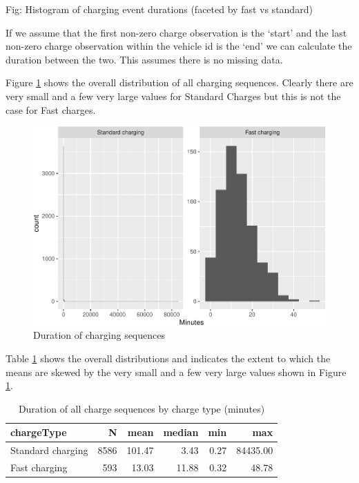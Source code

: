 \documentclass[]{article}
\begin{document}
Fig: Histogram of charging event durations (faceted by fast vs standard)

If we assume that the first non-zero charge observation is the `start'
and the last non-zero charge observation within the vehicle id is the
`end' we can calculate the duration between the two. This assumes there
is no missing data.

Figure \ref{fig:durationHist} shows the overall distribution of all
charging sequences. Clearly there are very small and a few very large
values for Standard Charges but this is not the case for Fast charges.

\begin{figure}
\centering
\includegraphics{EVBB_report_files/figure-latex/durationHist-1.pdf}
\caption{\label{fig:durationHist}Duration of charging sequences}
\end{figure}

Table \ref{tab:durationDescTable} shows the overall distributions and
indicates the extent to which the means are skewed by the very small and
a few very large values shown in Figure \ref{fig:durationHist}.

\begin{table}[t]

\caption{\label{tab:durationDescTable}Duration of all charge sequences by charge type (minutes)}
\centering
\begin{tabular}{l|r|r|r|r|r}
\hline
chargeType & N & mean & median & min & max\\
\hline
Standard charging & 8586 & 101.47 & 3.43 & 0.27 & 84435.00\\
\hline
Fast charging & 593 & 13.03 & 11.88 & 0.32 & 48.78\\
\hline
\end{tabular}
\end{table}
\end{document}
